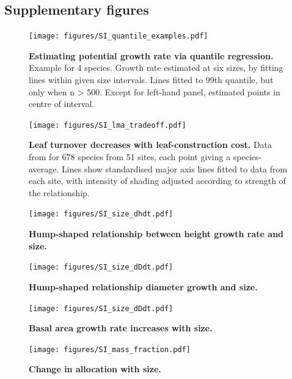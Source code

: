 \documentclass[12pt, a4paper]{article}
\begin{document}
\begin{appendices}
\newpage

\section{Supplementary figures}\label{supplementary-figures}

\begin{figure}[htbp]
\centering
\texttt{[image: figures/SI\_quantile\_examples.pdf]}
\caption{\textbf{Estimating potential growth rate via quantile
regression.} Example for 4 species. Growth rate estimated at six sizes,
by fitting lines within given size intervals. Lines fitted to 99th
quantile, but only when n \textgreater{} 500. Except for left-hand
panel, estimated points in centre of interval.
\label{fS-quantile_examples}}
\end{figure}

\begin{figure}[htbp]
\centering
\texttt{[image: figures/SI\_lma\_tradeoff.pdf]}
\caption{\textbf{Leaf turnover decreases with leaf-construction cost.}
Data from \citep{wright_world-2004} for 678 species from 51 sites, each
point giving a species-average. Lines show standardised major axis lines
fitted to data from each site, with intensity of shading adjusted
according to strength of the relationship.\label{fS-leaf}}
\end{figure}

\newpage

\begin{figure}[htbp]
\centering
\texttt{[image: figures/SI\_size\_dhdt.pdf]}
\caption{\textbf{Hump-shaped relationship between height growth rate and
size.} \label{f-hump}}
\end{figure}

\newpage

\begin{figure}[htbp]
\centering
\texttt{[image: figures/SI\_size\_dDdt.pdf]}
\caption{\textbf{Hump-shaped relationship diameter growth and size.}
\label{f-SI_size_dDdt}}
\end{figure}

\begin{figure}[htbp]
\centering
\texttt{[image: figures/SI\_size\_dDdt.pdf]}
\caption{\textbf{Basal area growth rate increases with size.}
\label{f-SI_size_dastdt}}
\end{figure}

\newpage

\begin{figure}[htbp]
\centering
\texttt{[image: figures/SI\_mass\_fraction.pdf]}
\caption{\textbf{Change in allocation with size.}
\label{f-mass_fraction}}
\end{figure}


\end{appendices}
\end{document}

